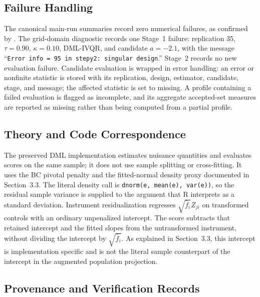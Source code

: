\subsection{Failure Handling}

The canonical main-run summaries record zero numerical failures, as confirmed by . The grid-domain diagnostic records one Stage~1 failure: replication 35, $\tau=0.90$, $\kappa=0.10$, DML-IVQR, and candidate $a=-2.1$, with the message ``\texttt{Error info = 95 in stepy2: singular design}.'' Stage~2 records no new evaluation failure. Candidate evaluation is wrapped in error handling: an error or nonfinite statistic is stored with its replication, design, estimator, candidate, stage, and message; the affected statistic is set to missing. A profile containing a failed evaluation is flagged as incomplete, and its aggregate accepted-set measures are reported as missing rather than being computed from a partial profile.

\subsection{Theory and Code Correspondence}

The preserved DML implementation estimates nuisance quantities and evaluates scores on the same sample; it does not use sample splitting or cross-fitting. It uses the BC pivotal penalty and the fitted-normal density proxy documented in Section~3.3. The literal density call is \texttt{dnorm(e, mean(e), var(e))}, so the residual sample variance is supplied to the argument that R interprets as a standard deviation. Instrument residualization regresses $\sqrt{\widehat f_i}Z_{ji}$ on transformed controls with an ordinary unpenalized intercept. The score subtracts that retained intercept and the fitted slopes from the untransformed instrument, without dividing the intercept by $\sqrt{\widehat f_i}$. As explained in Section~3.3, this intercept is implementation specific and is not the literal sample counterpart of the intercept in the augmented population projection.

\subsection{Provenance and Verification Records}

